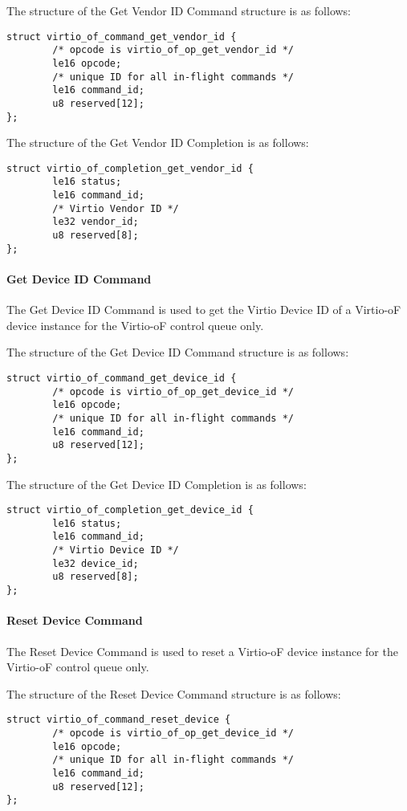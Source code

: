 The structure of the Get Vendor ID Command structure is as follows:
\begin{lstlisting}
struct virtio_of_command_get_vendor_id {
        /* opcode is virtio_of_op_get_vendor_id */
        le16 opcode;
        /* unique ID for all in-flight commands */
        le16 command_id;
        u8 reserved[12];
};
\end{lstlisting}

The structure of the Get Vendor ID Completion is as follows:
\begin{lstlisting}
struct virtio_of_completion_get_vendor_id {
        le16 status;
        le16 command_id;
        /* Virtio Vendor ID */
        le32 vendor_id;
        u8 reserved[8];
};
\end{lstlisting}

\paragraph{Get Device ID Command}\label{sec:Virtio Transport Options / Virtio Over Fabrics / Commands Definition / Opcodes / Get Device ID Command}
The Get Device ID Command is used to get the Virtio Device ID of a Virtio-oF device instance for the Virtio-oF control queue only.

The structure of the Get Device ID Command structure is as follows:
\begin{lstlisting}
struct virtio_of_command_get_device_id {
        /* opcode is virtio_of_op_get_device_id */
        le16 opcode;
        /* unique ID for all in-flight commands */
        le16 command_id;
        u8 reserved[12];
};
\end{lstlisting}

The structure of the Get Device ID Completion is as follows:
\begin{lstlisting}
struct virtio_of_completion_get_device_id {
        le16 status;
        le16 command_id;
        /* Virtio Device ID */
        le32 device_id;
        u8 reserved[8];
};
\end{lstlisting}

\paragraph{Reset Device Command}\label{sec:Virtio Transport Options / Virtio Over Fabrics / Commands Definition / Opcodes / Reset Device Command}
The Reset Device Command is used to reset a Virtio-oF device instance for the Virtio-oF control queue only.

The structure of the Reset Device Command structure is as follows:
\begin{lstlisting}
struct virtio_of_command_reset_device {
        /* opcode is virtio_of_op_get_device_id */
        le16 opcode;
        /* unique ID for all in-flight commands */
        le16 command_id;
        u8 reserved[12];
};
\end{lstlisting}

